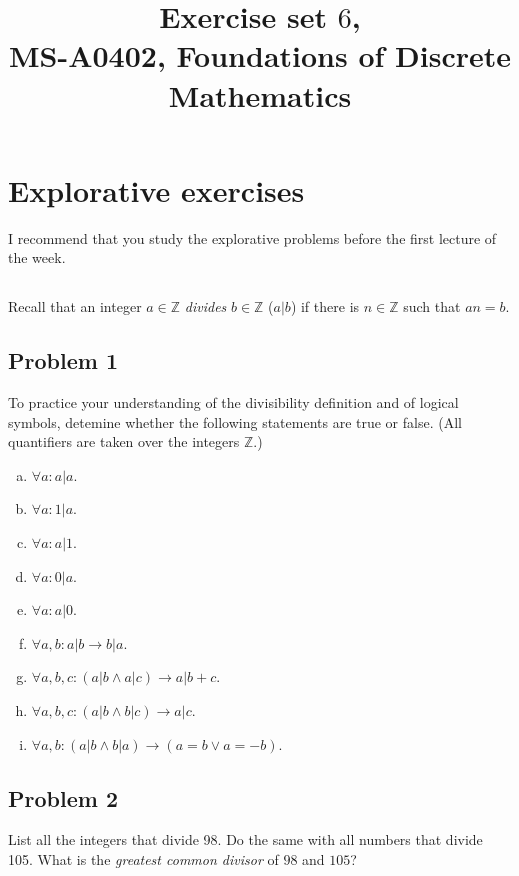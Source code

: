 \documentclass{amsart}
\title{Exercise set $6$, \\ MS-A0402, Foundations of Discrete Mathematics}
\newcommand{\Z}{\mathbb{Z}}
\theoremstyle{definition} \newtheorem*{definition}{Definition}
\theoremstyle{remark} \newtheorem*{ex}{Example}
\begin{document}
\hspace{-1cm}
\maketitle
 
\section*{Explorative exercises}
I recommend that you study the explorative problems before the first lecture of the week.

\subsection*{} Recall that an integer $a\in\Z$ {\em divides} $b\in\Z$ ($a|b$) if there is $n\in\Z$ such that $an=b$.

\subsection*{Problem 1}To practice your understanding of the divisibility definition and of logical symbols, detemine whether the following statements are true or false. (All quantifiers are taken over the integers $\Z$.)
\begin{enumerate}[a)]
\item $\forall a: a|a$.
\item $\forall a: 1|a$.
\item $\forall a: a|1$.
\item $\forall a: 0|a$.
\item $\forall a: a|0$.
\item $\forall a,b: a|b\to b|a$.
\item $\forall a,b,c : \left(a|b\wedge a|c\right)\to a|b+c$.
\item $\forall a,b,c : \left(a|b\wedge b|c\right)\to a|c$.
\item  $\forall a,b :  \left(a|b\wedge b|a\right)\to (a=b\vee a=-b)$.
\end{enumerate}

\subsection*{Problem 2} 
List all the integers that divide 98. Do the same with all numbers that divide 105. What is the {\em greatest common divisor} of $98$ and $105$?
\end{document}
